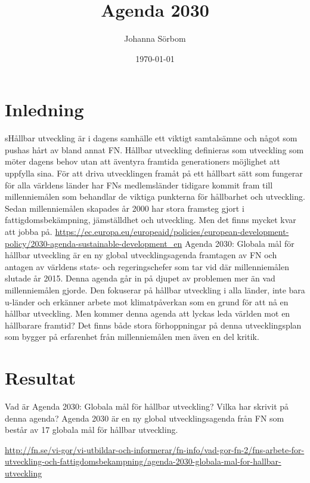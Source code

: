 \documentclass{report}
\title{Agenda 2030}
\date{\today}
\author{Johanna Sörbom}
\begin{document}
\maketitle
\newpage
\tableofcontents
\newpage
\section{Inledning}
sHållbar utveckling är i dagens samhälle ett viktigt samtalsämne och något som pushas hårt av bland annat FN. Hållbar utveckling definieras som utveckling som möter dagens behov utan att äventyra framtida generationers möjlighet att uppfylla sina.\cite{web2030agenda}
För att driva utvecklingen framåt på ett hållbart sätt som fungerar för alla världens länder har FNs medlemsländer tidigare kommit fram till millenniemålen som behandlar de viktiga punkterna för hållbarhet och utveckling.  Sedan millenniemålen skapades år 2000 har stora framsteg gjort i fattigdomsbekämpning, jämställdhet och utveckling. Men det finns mycket kvar att jobba på. \url{https://ec.europa.eu/europeaid/policies/european-development-policy/2030-agenda-sustainable-development_en}
Agenda 2030: Globala mål för hållbar utveckling är en ny global utvecklingsagenda framtagen av FN och antagen av världens stats- och regeringschefer som tar vid där millenniemålen slutade år 2015. Denna agenda går in på djupet av problemen mer än vad millenniemålen gjorde. Den fokuserar på hållbar utveckling i alla länder, inte bara u-länder och erkänner arbete mot klimatpåverkan som en grund för att nå en hållbar utveckling. Men kommer denna agenda att lyckas leda världen mot en hållbarare framtid? Det finns både stora förhoppningar på denna utvecklingsplan som bygger på erfarenhet från millenniemålen men även en del kritik. 

\section{Resultat}
Vad är Agenda 2030: Globala mål för hållbar utveckling? 
Vilka har skrivit på denna agenda?
Agenda 2030 är en ny global utvecklingsagenda från FN som består av 17 globala mål för hållbar utveckling. 


\url{http://fn.se/vi-gor/vi-utbildar-och-informerar/fn-info/vad-gor-fn-2/fns-arbete-for-utveckling-och-fattigdomsbekampning/agenda-2030-globala-mal-for-hallbar-utveckling} 
\end{document}
